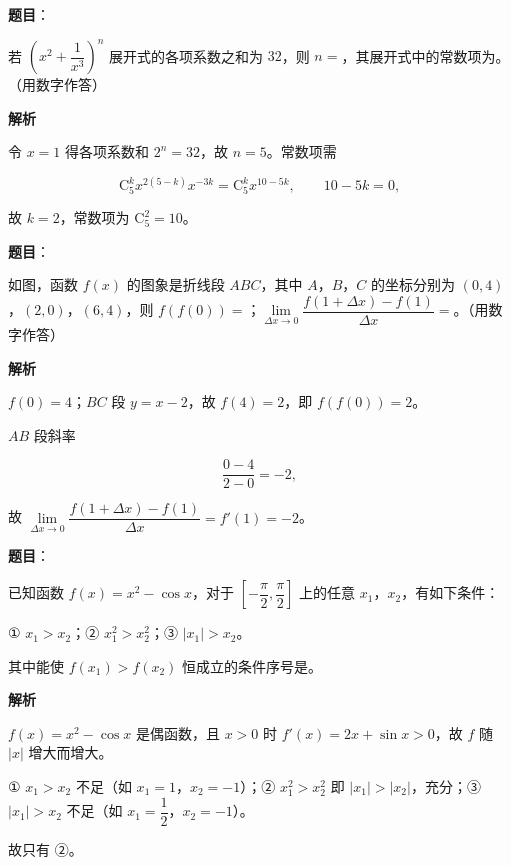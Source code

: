 \begin{answer}

\textbf{题目}：

若 $\left(x^2+\dfrac1{x^3}\right)^n$ 展开式的各项系数之和为 $32$，则 $n=$\gkblank{}，其展开式中的常数项为\gkblank{}。（用数字作答）

\textbf{解析}

令 $x=1$ 得各项系数和 $2^n=32$，故 $n=5$。常数项需

\nopagebreak[4]
\[\mathrm C_5^k x^{2(5-k)}x^{-3k}=\mathrm C_5^kx^{10-5k},\qquad 10-5k=0,\]

故 $k=2$，常数项为 $\mathrm C_5^2=10$。


\end{answer}
\begin{answer}

\textbf{题目}：

如图，函数 $f(x)$ 的图象是折线段 $ABC$，其中 $A$，$B$，$C$ 的坐标分别为 $(0,4)$，$(2,0)$，$(6,4)$，则 $f(f(0))=$\gkblank{}；$\lim\limits_{\Delta x\to0}\dfrac{f(1+\Delta x)-f(1)}{\Delta x}=$\gkblank{}。（用数字作答）
\nopagebreak[4]
\begin{center}\end{center}
\nopagebreak[4]
\textbf{解析}

$f(0)=4$；$BC$ 段 $y=x-2$，故 $f(4)=2$，即 $f(f(0))=2$。

$AB$ 段斜率

\nopagebreak[4]
\[\frac{0-4}{2-0}=-2,\]

故 $\lim\limits_{\Delta x\to0}\dfrac{f(1+\Delta x)-f(1)}{\Delta x}=f'(1)=-2$。


\end{answer}
\begin{answer}

\textbf{题目}：

已知函数 $f(x)=x^2-\cos x$，对于 $\left[-\dfrac{\pi}2,\dfrac{\pi}2\right]$ 上的任意 $x_1$，$x_2$，有如下条件：

① $x_1>x_2$；② $x_1^2>x_2^2$；③ $|x_1|>x_2$。

其中能使 $f(x_1)>f(x_2)$ 恒成立的条件序号是\gkblank{}。

\textbf{解析}

$f(x)=x^2-\cos x$ 是偶函数，且 $x>0$ 时 $f'(x)=2x+\sin x>0$，故 $f$ 随 $|x|$ 增大而增大。

① $x_1>x_2$ 不足（如 $x_1=1$，$x_2=-1$）；② $x_1^2>x_2^2$ 即 $|x_1|>|x_2|$，充分；③ $|x_1|>x_2$ 不足（如 $x_1=\dfrac12$，$x_2=-1$）。

故只有 ②。


\end{answer}
